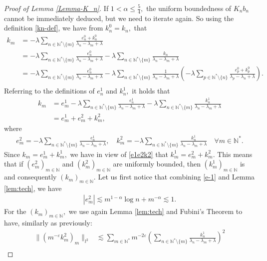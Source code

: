 \documentclass[10pt,a4paper]{amsart}
\begin{document}
\begin{proof}[Proof of Lemma \ref{Lemma-K_n}]
If $1<\alpha\leq\frac{5}{4},$ the uniform boundedness of $K_n b_n$ cannot be immediately deduced, but we need to iterate again. So using the definition \eqref{kn-def}, we have from $k_n^0=k_n,$ that
\begin{align*}
     k_m&=-\lambda\sum_{n\in \mathbb{N}^*\setminus\{m\}}\frac{e_n^0+k_n^0}{\lambda_n-\lambda_m+\lambda}\\
     &=-\lambda\sum_{n\in \mathbb{N}^*\setminus\{m\}}\frac{e_n^0}{\lambda_n-\lambda_m+\lambda}-\lambda\sum_{n\in \mathbb{N}^*\setminus\{m\}}\frac{k_n}{\lambda_n-\lambda_m+\lambda}\\
     &=-\lambda\sum_{n\in \mathbb{N}^*\setminus\{m\}}\frac{e_n^0}{\lambda_n-\lambda_m+\lambda}-\lambda\sum_{n\in \mathbb{N}^*\setminus\{m\}}\frac{1}{\lambda_n-\lambda_m+\lambda}\left(-\lambda\sum_{p\in \mathbb{N}^*\setminus\{n\}}\frac{e_p^0+k_p^0}{\lambda_p-\lambda_n+\lambda}\right).\\
\end{align*}
Referring to the definitions of $e_n^1$ and $k_n^1,$ it holds that
\begin{align}
 k_m&=e_m^1-\lambda\sum_{n\in \mathbb{N}^*\setminus\{m\}}\frac{e_n^1}{\lambda_n-\lambda_m+\lambda} -\lambda\sum_{n\in \mathbb{N}^*\setminus\{m\}}\frac{k_n^1}{\lambda_n-\lambda_m+\lambda}\nonumber\\
 &=e_m^1+e_m^2+k_m^2,\label{e1e2k2}
\end{align} where
\begin{align*}
  e_m^2=  -\lambda\sum_{n\in \mathbb{N}^*\setminus\{m\}}\frac{e_n^1}{\lambda_n-\lambda_m+\lambda}, \quad k_m^2=-\lambda\sum_{n\in \mathbb{N}^*\setminus\{m\}}\frac{k_n^1}{\lambda_n-\lambda_m+\lambda} \quad \forall m\in \mathbb{N}^*.
\end{align*}
Since $k_m=e_m^1+k_m^1,$ we have in view of \eqref{e1e2k2} that $k_m^1=e_m^2+k_m^2.$ This means that if $(e_m^2)_{m\in \mathbb{N}}$ and $(k_m^2)_{m\in \mathbb{N}}$ are uniformly bounded, then $(k_m^1)_{m\in \mathbb{N}}$ is and consequently $(k_m)_{m\in \mathbb{N}}.$ Let us first notice that combining \eqref{e-1} and Lemma \ref{lem:tech}, we have
\begin{align*}
    |e_m^2|\lesssim m^{1-\alpha}\log n+m^{-\alpha}\lesssim 1.
\end{align*}
For the $(k_m)_{m\in \mathbb{N}},$ we use again Lemma \eqref{lem:tech}  and Fubini's Theorem to have, similarly as previously:
\begin{align*}
    \|(m^{-\varepsilon} k_m^2)_m\|_{l^2}&\lesssim \sum_{m\in \mathbb{N}^*}m^{-2\varepsilon}\left(\sum_{n\in \mathbb{N}^*\setminus\{m\}}\frac{k_n^1}{\lambda_n-\lambda_m+\lambda}\right)^2\\

\end{align*}
\end{proof}
\end{document}
